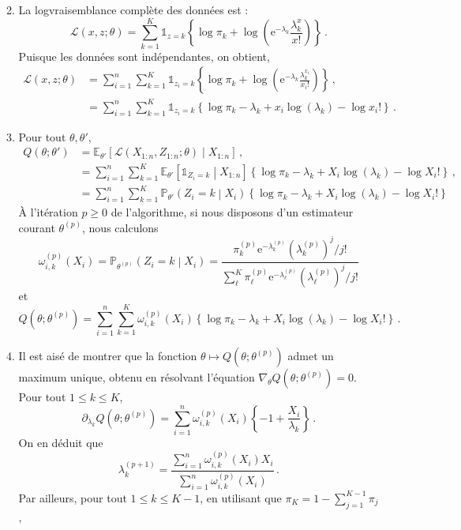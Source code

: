 \documentclass[a4paper,10pt,fleqn]{article}
\newcommand{\1}{\ensuremath{\mathbbm{1}}}
\begin{document}
\begin{enumerate}
\begin{enumerate}
$$$$
\item La logvraisemblance compl\`ete des donn\'ees est :
$$
\mathcal{L}(x,z;\theta) = \sum_{k=1}^K \mathds{1}_{z=k}\left\{\log \pi_k + \log \left(\mathrm{e}^{-\lambda_k}\frac{\lambda_k^{x}}{x!}\right)\right\}\,.
$$
Puisque les donn\'ees sont ind\'ependantes, on obtient,
\begin{align*}
\mathcal{L}(x,z;\theta) &= \sum_{i=1}^n\sum_{k=1}^K \mathds{1}_{z_i=k}\left\{\log \pi_k + \log \left(\mathrm{e}^{-\lambda_k}\frac{\lambda_k^{x_i}}{x_i!}\right)\right\}\,,\\
&=\sum_{i=1}^n\sum_{k=1}^K \mathds{1}_{z_i=k}\left\{\log \pi_k - \lambda_k+ x_i\log \left(\lambda_k\right) - \log x_i!\right\}\,.
\end{align*}
\item Pour tout $\theta, \theta'$,
\begin{align*}
Q(\theta;\theta') &= \mathbb{E}_{\theta'}\left[\mathcal{L}(X_{1:n},Z_{1:n};\theta)\middle|X_{1:n}\right] \,,\\
&= \sum_{i=1}^n\sum_{k=1}^K \mathbb{E}_{\theta'}\left[\mathds{1}_{Z_i=k}\middle|X_{1:n}\right]\left\{\log \pi_k - \lambda_k+ X_i\log \left(\lambda_k\right) - \log X_i!\right\}\,,\\
&= \sum_{i=1}^n\sum_{k=1}^K \mathbb{P}_{\theta'}\left(Z_i=k\middle|X_{i}\right)\left\{\log \pi_k - \lambda_k+ X_i\log \left(\lambda_k\right) - \log X_i!\right\}
\end{align*}
\`A l'it\'eration $p\geq 0$ de l'algorithme, si nous disposons d'un estimateur courant $\theta^{(p)}$, nous calculons
$$
\omega_{i,k}^{(p)}(X_i) = \mathbb{P}_{\theta^{(p)}}\left(Z_i=k\middle|X_{i}\right) = \frac{\pi^{(p)}_k \mathrm{e}^{-\lambda^{(p)}_k}(\lambda^{(p)}_k)^{j}/j!}{\sum_{\ell}^K\pi^{(p)}_\ell \mathrm{e}^{-\lambda^{(p)}_\ell}(\lambda^{(p)}_\ell)^{j}/j!}
$$
et 
$$
Q(\theta;\theta^{(p)}) = \sum_{i=1}^n\sum_{k=1}^K \omega_{i,k}^{(p)}(X_i) \left\{\log \pi_k - \lambda_k+ X_i\log \left(\lambda_k\right) - \log X_i!\right\}\,.
$$
\item Il est ais\'e de montrer que la fonction $\theta \mapsto Q(\theta;\theta^{(p)}) $ admet un maximum unique, obtenu en r\'esolvant l'\'equation $\nabla_\theta Q(\theta;\theta^{(p)}) = 0$. Pour tout $1\leq k \leq K$,
$$
\partial_{\lambda_k}Q(\theta;\theta^{(p)}) = \sum_{i=1}^n\omega_{i,k}^{(p)}(X_i) \left\{ - 1+ \frac{X_i}{\lambda_k}\right\}\,.
$$
On en d\'eduit que
$$
\lambda^{(p+1)}_k = \frac{\sum_{i=1}^n\omega_{i,k}^{(p)}(X_i)X_i}{\sum_{i=1}^n\omega_{i,k}^{(p)}(X_i)}\,.
$$
Par ailleurs, pour tout $1\leq k \leq K-1$, en utilisant que $\pi_K = 1 - \sum_{j=1}^{K-1}\pi_j$,

\end{enumerate}
\end{enumerate}
\end{document}
